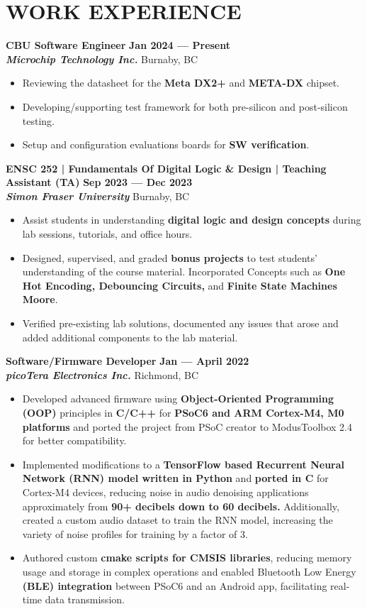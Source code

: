 \documentclass[letterpaper,11pt]{article}
\newcommand{\Item} [1] {
    \item\small{{#1 \vspace{-2pt}}}
}
\newcommand{\employer} [5] {
    {\textbf{#3} \hfill \textbf{#4 --- #5}\\ \textbf{\emph{#1}} \hfill #2\\}
}
\newcommand{\workItemListStart} [0] {
    \vspace{-1pt}
    \begin{itemize}[topsep=0pt,itemsep=-2pt]
}
\newcommand{\workItemListEnd} [0] {
    \end{itemize}
    \vspace{1pt}
}
\begin{document}
    \section{WORK EXPERIENCE}
    \employer{Microchip Technology Inc.}{Burnaby, BC}{CBU Software Engineer}{Jan 2024}{Present}
    \workItemListStart{}
        \Item{Reviewing the datasheet for the \textbf{Meta DX2+} and \textbf{META-DX} chipset.}
        \Item{Developing/supporting test framework for both pre-silicon and post-silicon testing.}
        \Item{Setup and configuration evaluations boards for \textbf{SW verification}.}
    \workItemListEnd{}
    \employer{Simon Fraser University}{Burnaby, BC}{ENSC 252 | Fundamentals Of Digital Logic & Design | Teaching Assistant (TA)}{Sep 2023}{Dec 2023}
    \workItemListStart{}
    \Item{Assist students in understanding \textbf{digital logic and design concepts} during lab sessions, tutorials, and office hours.}
    \Item{Designed, supervised, and graded \textbf{bonus projects} to test students' understanding of the course material. Incorporated Concepts such as \textbf{One Hot Encoding, Debouncing Circuits,} and \textbf{Finite State Machines {Moore}}.}
    \Item{Verified pre-existing lab solutions, documented any issues that arose and added additional components to the lab material.}
    \workItemListEnd{}
    \employer{picoTera Electronics Inc.}{Richmond, BC}{Software/Firmware Developer}{Jan}{April 2022}
    \workItemListStart{}
        \Item{Developed advanced firmware using \textbf{Object-Oriented Programming (OOP)} principles in \textbf{C/C++} for \textbf{PSoC6 and ARM Cortex-M4, M0 platforms} and ported the project from PSoC creator to ModusToolbox 2.4 for better compatibility.}
        \Item{Implemented modifications to a \textbf{TensorFlow based Recurrent Neural Network (RNN) model written in Python} and \textbf{ported in C} for Cortex-M4 devices, reducing noise in audio denoising applications approximately from \textbf{90+ decibels down to 60 decibels.} Additionally, created a custom audio dataset to train the RNN model, increasing the variety of noise profiles for training by a factor of 3.}
        \Item{Authored custom \textbf{cmake scripts for CMSIS libraries}, reducing memory usage and storage in complex operations and enabled Bluetooth Low Energy \textbf{(BLE) integration} between PSoC6 and an Android app, facilitating real-time data transmission.}
    \workItemListEnd{}
\end{document}
